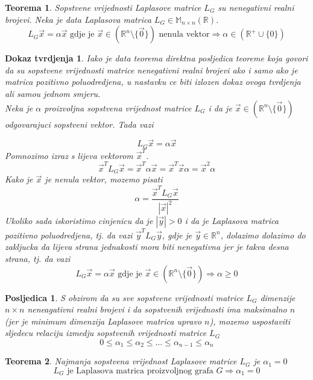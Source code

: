 \documentclass[11pt]{article}
\newtheorem{theorem}{Teorema}
\newtheorem*{custom_proof}{Dokaz tvrdjenja}
\newtheorem{consequence}{Posljedica}
\begin{document}
	\begin{theorem} Sopstvene vrijednosti Laplasove matrice $L_G$ su nenegativni realni brojevi.
	Neka je data Laplasova matrica $L_G \in  \mathbb{M}_{n \times n}(\mathbb{R})$.
	\[
	 L_G\vec{x} = \alpha \vec{x} \text{ gdje je } \vec{x} \in ( \mathbb{R}^n \setminus \{\vec{0}\}) \text{ nenula vektor} \Rightarrow \alpha \in (\mathbb{R}^+ \cup \{0\})
	\]
	\end{theorem}
	
	\begin{custom_proof}
	Iako je data teorema direktna posljedica teoreme koja govori da su sopstvene vrijednosti matrice nenegativni realni brojevi ako i samo ako je matrica pozitivno poluodredjena, u nastavku ce biti izlozen dokaz ovoga tvrdjenja ali samou jednom smjeru. \\
	
	Neka je $\alpha$ proizvoljna sopstvena vrijednost matrice $L_G$ i da je $\vec{x} \in (\mathbb{R}^n \setminus \{\vec{0}\})$ odgovarajuci sopstveni vektor. Tada vazi
	
	\[
		L_G\vec{x} = \alpha \vec{x}
	\]
	Pomnozimo izraz s lijeva vektorom $\vec{x}^T$.
	\[
		\vec{x}^TL_G\vec{x} = \vec{x}^T\alpha \vec{x} = \vec{x}^T \vec{x} \alpha = \vec{x}^2 \alpha 
	\]
	Kako je $\vec{x}$ je nenula vektor, mozemo pisati
	\[
	 \alpha = \frac{\vec{x}^TL_G\vec{x}}{|\vec{x}|^2}
	\]
	Ukoliko sada iskoristimo cinjenicu da je $|\vec{y}| > 0$ i da je Laplasova matrica pozitivno poluodredjena, tj. da vazi $\vec{y}^TL_G\vec{y}$, gdje je $\vec{y} \in \mathbb{R}^n$, dolazimo dolazimo do zakljucka da lijeva strana jednakosti mora biti nenegativna jer je takva desna strana, tj. da vazi
	\[
		L_G\vec{x} = \alpha \vec{x} \text{ gdje je } \vec{x} \in (\mathbb{R}^n \setminus \{\vec{0}\}) \Rightarrow \alpha \geq 0
	\] 
	\end{custom_proof}
	
	\begin{consequence}
	S obzirom da su sve sopstvene vrijednosti matrice $L_G$ dimenzije $n \times n$ neneagativni realni brojevi i da sopstvenih vrijednosti ima maksimalno $n$ (jer je minimum dimenzija Laplasove matrica upravo $n$), mozemo uspostaviti sljedecu relaciju izmedju sopstvenih vrijednosti matrice $L_G$ 
	\[
	0 \leq \alpha_1 \leq \alpha_2 \leq \dots \leq \alpha_{n-1} \leq \alpha_n
	\]
	\end{consequence}
	
	\begin{theorem} Najmanja sopstvena vrijednost Laplasove matrice $L_G$ je $\alpha_1=0$
	\[
	L_G \text{ je Laplasova matrica proizvoljnog grafa } G \Rightarrow \alpha_1=0
	\]
	\end{theorem}
	
\end{document}
